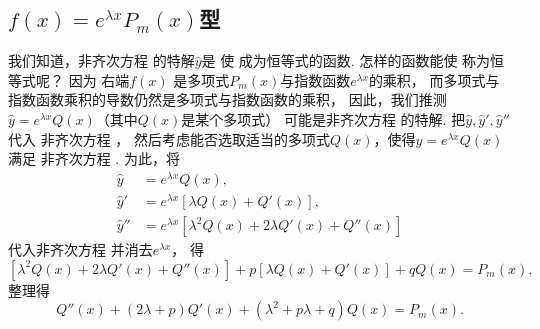 \subsection{\texorpdfstring{\(f(x) = e^{\lambda x} P_m(x)\)型}{第一类：指数函数与多项式函数的乘积}}
我们知道，非齐次方程  的特解\(\hat{y}\)是
使  成为恒等式的函数.
怎样的函数能使  称为恒等式呢？
因为  右端\(f(x)\)
是多项式\(P_m(x)\)与指数函数\(e^{\lambda x}\)的乘积，
而多项式与指数函数乘积的导数仍然是多项式与指数函数的乘积，
因此，我们推测\(\hat{y} = e^{\lambda x} Q(x)\)（其中\(Q(x)\)是某个多项式）
可能是非齐次方程  的特解.
把\(\hat{y}, \hat{y}', \hat{y}''\)代入
非齐次方程 ，
然后考虑能否选取适当的多项式\(Q(x)\)，使得\(\hat{y} = e^{\lambda x} Q(x)\)满足
非齐次方程 .
为此，将\begin{align*}
	\hat{y} &= e^{\lambda x} Q(x), \\
	\hat{y}' &= e^{\lambda x} [ \lambda Q(x) + Q'(x) ], \\
	\hat{y}'' &= e^{\lambda x} [ \lambda^2 Q(x) + 2\lambda Q'(x) + Q''(x) ]
\end{align*}
代入非齐次方程 
并消去\(e^{\lambda x}\)，
得\[
	[ \lambda^2 Q(x) + 2\lambda Q'(x) + Q''(x) ]
	+ p [ \lambda Q(x) + Q'(x) ]
	+ q Q(x)
	= P_m(x),
\]
整理得\begin{equation}\label{equation:微分方程.常系数非齐次线性微分方程.中间步骤1}
	Q''(x) + (2\lambda+p) Q'(x) + (\lambda^2+p\lambda+q) Q(x) = P_m(x).
\end{equation}
